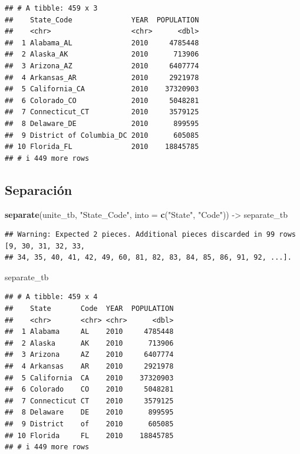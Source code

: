 \documentclass[
]{book}
\newenvironment{Shaded}{\begin{snugshade}}{\end{snugshade}}
\newcommand{\AttributeTok}[1]{\textcolor[rgb]{0.13,0.29,0.53}{#1}}
\newcommand{\FunctionTok}[1]{\textcolor[rgb]{0.13,0.29,0.53}{\textbf{#1}}}
\newcommand{\NormalTok}[1]{#1}
\newcommand{\OtherTok}[1]{\textcolor[rgb]{0.56,0.35,0.01}{#1}}
\newcommand{\StringTok}[1]{\textcolor[rgb]{0.31,0.60,0.02}{#1}}
\begin{document}
\begin{verbatim}
## # A tibble: 459 x 3
##    State_Code              YEAR  POPULATION
##    <chr>                   <chr>      <dbl>
##  1 Alabama_AL              2010     4785448
##  2 Alaska_AK               2010      713906
##  3 Arizona_AZ              2010     6407774
##  4 Arkansas_AR             2010     2921978
##  5 California_CA           2010    37320903
##  6 Colorado_CO             2010     5048281
##  7 Connecticut_CT          2010     3579125
##  8 Delaware_DE             2010      899595
##  9 District of Columbia_DC 2010      605085
## 10 Florida_FL              2010    18845785
## # i 449 more rows
\end{verbatim}

\subsection*{Separación}\label{separaciuxf3n}

\begin{Shaded}
\begin{Highlighting}[]
\FunctionTok{separate}\NormalTok{(unite\_tb, }\StringTok{"State\_Code"}\NormalTok{, }\AttributeTok{into =} \FunctionTok{c}\NormalTok{(}\StringTok{"State"}\NormalTok{, }\StringTok{"Code"}\NormalTok{)) }\OtherTok{{-}\textgreater{}}\NormalTok{ separate\_tb}
\end{Highlighting}
\end{Shaded}

\begin{verbatim}
## Warning: Expected 2 pieces. Additional pieces discarded in 99 rows [9, 30, 31, 32, 33,
## 34, 35, 40, 41, 42, 49, 60, 81, 82, 83, 84, 85, 86, 91, 92, ...].
\end{verbatim}

\begin{Shaded}
\begin{Highlighting}[]
\NormalTok{separate\_tb}
\end{Highlighting}
\end{Shaded}

\begin{verbatim}
## # A tibble: 459 x 4
##    State       Code  YEAR  POPULATION
##    <chr>       <chr> <chr>      <dbl>
##  1 Alabama     AL    2010     4785448
##  2 Alaska      AK    2010      713906
##  3 Arizona     AZ    2010     6407774
##  4 Arkansas    AR    2010     2921978
##  5 California  CA    2010    37320903
##  6 Colorado    CO    2010     5048281
##  7 Connecticut CT    2010     3579125
##  8 Delaware    DE    2010      899595
##  9 District    of    2010      605085
## 10 Florida     FL    2010    18845785
## # i 449 more rows
\end{verbatim}

  
\end{document}
